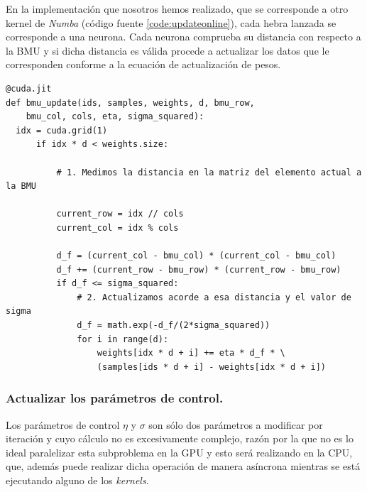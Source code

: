 En la implementación que nosotros hemos realizado, que se corresponde a otro kernel de \textit{Numba} (código fuente \ref{code:updateonline}), cada hebra lanzada se corresponde a una neurona. Cada neurona comprueba su distancia con respecto a la BMU y si dicha distancia es válida procede a actualizar los datos que le corresponden conforme a la ecuación de actualización de pesos.

\begin{code}
\begin{verbatim}
@cuda.jit
def bmu_update(ids, samples, weights, d, bmu_row, 
    bmu_col, cols, eta, sigma_squared):
  idx = cuda.grid(1)
      if idx * d < weights.size:
          
          # 1. Medimos la distancia en la matriz del elemento actual a la BMU
          
          current_row = idx // cols
          current_col = idx % cols

          d_f = (current_col - bmu_col) * (current_col - bmu_col)
          d_f += (current_row - bmu_row) * (current_row - bmu_row)
          if d_f <= sigma_squared:
              # 2. Actualizamos acorde a esa distancia y el valor de sigma
              d_f = math.exp(-d_f/(2*sigma_squared))
              for i in range(d):
                  weights[idx * d + i] += eta * d_f * \
                  (samples[ids * d + i] - weights[idx * d + i])
\end{verbatim}
\label{code:updateonline}
\end{code}

\subsubsection{Actualizar los parámetros de control.}
Los parámetros de control $\eta$ y $\sigma$ son sólo dos parámetros a modificar por iteración y cuyo cálculo no es excesivamente complejo, razón por la que no es lo ideal paralelizar esta subproblema en la GPU y esto será realizando en la CPU, que, además puede realizar dicha operación de manera asíncrona mientras se está ejecutando alguno de los \textit{kernels}.

